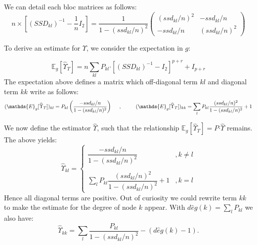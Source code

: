 \documentclass[11pt,a4paper]{article}
\newcommand{\Esp}{\mathds{E}}
\newcommand{\had}{\boldsymbol{\cdot}}
\begin{document}
We can detail each bloc matrices as follows:
\[
n\times [(SSD_{kl})^{-1} - \frac{1}{n}I_2] = \frac{1}{1-(ssd_{kl}/n)^2}
\left(\begin{array}{cc}
		(ssd_{kl}/n)^2   & -ssd_{kl}/n\\
		-ssd_{kl}/n& (ssd_{kl}/n)^2 
		\end{array}\right)
\]

To derive an estimate for $\Upsilon$, we consider the expectation in $g$:

$$\Esp_g[\widehat{\Upsilon}_T]= n\sum_{kl} P_{kl} \had [(SSD_{kl})^{-1} - I_2]^{p+r} + I_{p+r}$$
 The expectation above defines a matrix which off-diagonal term $kl$ and diagonal term $kk$ write as follows:
$$(\Esp_g[\widehat{\Upsilon}_T])_{kl} = P_{kl} \left(\frac{-ssd_{kl}/n}{1-(ssd_{kl}/n)^2} \right)\text{\hspace{0.5cm},\hspace{1cm}}(\Esp_g[\widehat{\Upsilon}_T])_{kk} = \sum_l P_{kl} \frac{(ssd_{kl}/n)^2}{1-(ssd_{kl}/n)^2} +1 $$
 
 We now define the estimator $\widehat{\Upsilon}$, such that the relationship $\Esp_g[\widehat{\Upsilon}_T]=P\had \widehat{\Upsilon}$ remains. The above yields:
 \[ \boxed{\widehat{\Upsilon}_{kl}=\left\{\begin{array}{cl}
  \dfrac{-ssd_{kl}/n}{1-(ssd_{kl}/n)^2} & ,k\neq l\\\\
 \sum_l P_{kl} \dfrac{(ssd_{kl}/n)^2}{1-(ssd_{kl}/n)^2} +1 & ,k=l
 \end{array}\right.
 }\]
Hence all diagonal terms are positive. Out of curiosity we could rewrite term $kk$ to make the estimate for the degree of node $k$ appear. With $d\widehat{e}g(k)=\sum_l P_{kl}$ we also have:
$$\widehat{\Upsilon}_{kk} =\sum_l \frac{P_{kl} }{1-(ssd_{kl}/n)^2} -(d\widehat{e}g(k)-1).$$
 
\newpage

 \appendix
 
\end{document}
